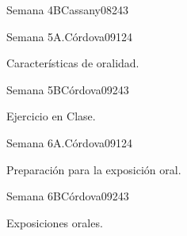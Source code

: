 \begin{syllabus}
\begin{unit}{Semana 4B}{Cassany08}{24}{3}
   \begin{unitgoals}
      \item 
      \item
      \item 
      \end{unitgoals}
\end{unit}


\begin{unit}{Semana 5A.}{Córdova09}{12}{4}
   \begin{topics}
      \item Características de oralidad.
   \end{topics}
   \begin{unitgoals}
      \item 
   \end{unitgoals}
\end{unit}

\begin{unit}{Semana 5B}{Córdova09}{24}{3}
   \begin{topics}
      \item Ejercicio en Clase.
   \end{topics}

   \begin{unitgoals}
      \item 
      \item
      \item 
      \end{unitgoals}
\end{unit}

\begin{unit}{Semana 6A.}{Córdova09}{12}{4}
   \begin{topics}
      \item Preparación para la exposición oral. 
   \end{topics}
   \begin{unitgoals}
      \item 
   \end{unitgoals}
\end{unit}

\begin{unit}{Semana 6B}{Córdova09}{24}{3}
   \begin{topics}
      \item Exposiciones orales.
   \end{topics}

   \begin{unitgoals}
      \item 
      \item
      \item 
      \end{unitgoals}
\end{unit}



\end{syllabus}
